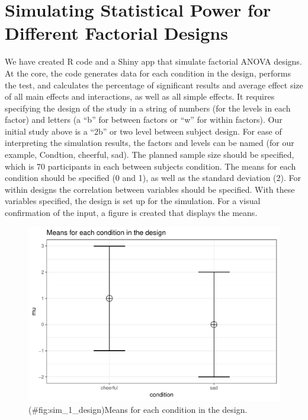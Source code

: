 \documentclass[,man,floatsintext]{apa6}
\begin{document}
\section{Simulating Statistical Power for Different Factorial
Designs}\label{simulating-statistical-power-for-different-factorial-designs}

We have created R code and a Shiny app that simulate factorial ANOVA
designs. At the core, the code generates data for each condition in the
design, performs the test, and calculates the percentage of significant
results and average effect size of all main effects and interactions, as
well as all simple effects. It requires specifying the design of the
study in a string of numbers (for the levels in each factor) and letters
(a \enquote{b} for between factors or \enquote{w} for within factors).
Our initial study above is a \enquote{2b} or two level between subject
design. For ease of interpreting the simulation results, the factors and
levels can be named (for our example, Condtion, cheerful, sad). The
planned sample size should be specified, which is 70 participants in
each between subjects condition. The means for each condition should be
specified (0 and 1), as well as the standard deviation (2). For within
designs the correlation between variables should be specified. With
these variables specified, the design is set up for the simulation. For
a visual confirmation of the input, a figure is created that displays
the means.

\begin{figure}
\centering
\includegraphics{0.1_Simulation_Based_Power_Analysis_For_Factorial_ANOVA_Designs_files/figure-latex/sim_1_design-1.pdf}
\caption{(\#fig:sim\_1\_design)Means for each condition in the design.}
\end{figure}
\end{document}
